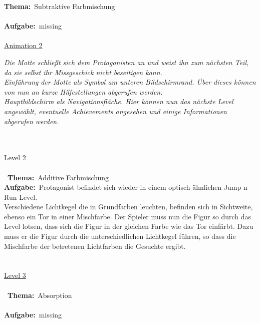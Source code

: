 \documentclass[10pt,a4paper,notitlepage]{report}
\begin{document}
	\textbf{Thema:}\
	Subtraktive Farbmischung
	\\\\
	\textbf{Aufgabe:}\
	missing
	\\\\
	\underline{Animation 2}\
	\\
	\begin{flushright}
	\textit{Die Motte schließt sich dem Protagonisten an und weist ihn zum nächsten Teil, da sie selbst ihr Missgeschick nicht beseitigen kann.\\
	Einführung der Motte als Symbol am unteren Bildschirmrand. Über dieses können von nun an kurze Hilfestellungen abgerufen werden.\\
	Hauptbildschirm als Navigationsfläche. Hier können nun das nächste Level angewählt, eventuelle Achievements angesehen und einige 
	Informationen abgerufen werden.}
	\end{flushright}\
	\\\\
	\underline{Level 2}\\\\\
	\textbf{Thema:}\
	Additive Farbmischung
	\
	\\
	\textbf{Aufgabe:}\	
	Protagonist befindet sich wieder in einem optisch ähnlichen Jump n Run Level.\\
	Verschiedene Lichtkegel die in Grundfarben leuchten, befinden sich in Sichtweite, ebenso ein Tor in einer Mischfarbe.
	 Der Spieler muss nun die Figur so durch das Level lotsen, dass sich die Figur in der gleichen Farbe wie das Tor einfärbt. 
	Dazu muss er die Figur durch die unterschiedlichen Lichtkegel führen, so dass die Mischfarbe der betretenen Lichtfarben die Gesuchte ergibt.\\
	\\\\
	\underline{Level 3}\\\\\
	\textbf{Thema:}\
	Absorption
	\\\\
	\textbf{Aufgabe:}\
	missing
\end{document}
